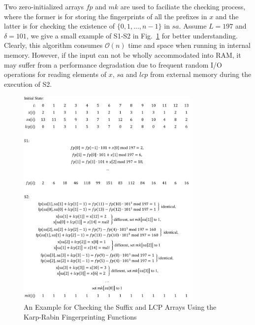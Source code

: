 \documentclass[10pt,journal,compsoc]{IEEEtran}
\begin{document}
Two zero-initialized arrays $fp$ and $mk$ are used to faciliate the checking process, where the former is for storing the fingerprints of all the prefixes in $x$ and the latter is for checking the existence of $\{0, 1, ..., n - 1\}$ in $sa$. Assume $L = 197$ and $\delta = 101$, we give a small example of S1-S2 in Fig.~\ref{fig:example} for better understanding. Clearly, this algorithm consumes $\mathcal{O}(n)$ time and space when running in internal memory. However, if the input can not be wholly accommodated into RAM, it may suffer from a performance degradation due to frequent random I/O operations for reading elements of $x$, $sa$ and $lcp$ from external memory during the execution of S2. 

\begin{figure}
	\centering
	\label{fig:example}
	\includegraphics[width = 0.8\textwidth]{example}
	\caption{An Example for Checking the Suffix and LCP Arrays Using the Karp-Rabin Fingerprinting Functions}	
\end{figure}

\end{document}
